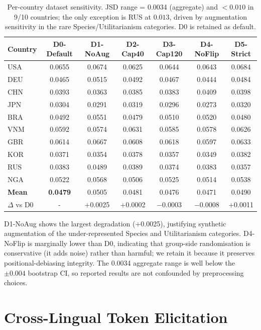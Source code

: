 \documentclass{article}
\begin{document}
\begin{table}[h]\centering\small
\caption{Per-country dataset sensitivity. JSD range = 0.0034 (aggregate) and
$<0.010$ in 9/10 countries; the only exception is RUS at $0.013$, driven by
augmentation sensitivity in the rare Species/Utilitarianism categories.
D0 is retained as default.}
\label{tab:dataset_sens}\scriptsize
\begin{tabular}{lcccccc}\toprule
Country & D0-Default & D1-NoAug & D2-Cap40 & D3-Cap120 & D4-NoFlip & D5-Strict \\\midrule
USA & 0.0655 & 0.0674 & 0.0625 & 0.0644 & 0.0643 & 0.0684 \\
DEU & 0.0465 & 0.0515 & 0.0492 & 0.0467 & 0.0444 & 0.0484 \\
CHN & 0.0393 & 0.0363 & 0.0385 & 0.0383 & 0.0409 & 0.0398 \\
JPN & 0.0304 & 0.0291 & 0.0319 & 0.0296 & 0.0273 & 0.0320 \\
BRA & 0.0492 & 0.0551 & 0.0479 & 0.0510 & 0.0520 & 0.0480 \\
VNM & 0.0592 & 0.0574 & 0.0631 & 0.0585 & 0.0578 & 0.0626 \\
GBR & 0.0614 & 0.0667 & 0.0608 & 0.0618 & 0.0597 & 0.0633 \\
KOR & 0.0371 & 0.0354 & 0.0378 & 0.0357 & 0.0349 & 0.0382 \\
RUS & 0.0383 & 0.0489 & 0.0389 & 0.0374 & 0.0383 & 0.0357 \\
NGA & 0.0522 & 0.0568 & 0.0506 & 0.0525 & 0.0514 & 0.0538 \\\midrule
\textbf{Mean} & \textbf{0.0479} & 0.0505 & 0.0481 & 0.0476 & 0.0471 & 0.0490 \\
$\Delta$ vs D0 & - & $+$0.0025 & $+$0.0002 & $-$0.0003 & $-$0.0008 & $+$0.0011 \\\bottomrule
\end{tabular}
\end{table}

D1-NoAug shows the largest degradation ($+$0.0025), justifying synthetic
augmentation of the under-represented Species and Utilitarianism categories.
D4-NoFlip is marginally lower than D0, indicating that group-side randomisation
is conservative (it adds noise) rather than harmful; we retain it because it
preserves positional-debiasing integrity. The 0.0034 aggregate range is well below
the $\pm0.004$ bootstrap CI, so reported results are not confounded by
preprocessing choices.

\section{Cross-Lingual Token Elicitation}
\label{app:token_elicitation}
\end{document}
